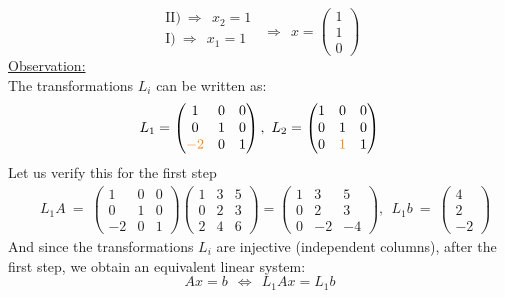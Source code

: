 \begin{frame}
{{$$\begin{matrix}
				\text{II)}~\Rightarrow~~x_2=1\\
				\text{I)}~\Rightarrow~~x_1=1\\
				\end{matrix}~~\Rightarrow~~x=\begin{pmatrix}1\\1\\0\end{pmatrix}
				$$
%			
					\underline{Observation:}\\
					The transformations $L_i$ can be written as:
					$$
					L_1=
					\begin{pmatrix}
					1&0&0\\0&1&0\\{\color{orange}-2}&0&1
					\end{pmatrix},~
					L_2=
					\begin{pmatrix}
					1&0&0\\0&1&0\\0&{\color{orange}1}&1
					\end{pmatrix}
					$$
				Let us verify this for the first step
				\begin{align*}
				&L_1A~=~\begin{pmatrix}
				1&0&0\\0&1&0\\-2&0&1
				\end{pmatrix}
				\begin{pmatrix}
				1&3&5\\0&2&3\\2&4&6
				\end{pmatrix}
				=\begin{pmatrix}
				1&3&5\\0&2&3\\0&-2&-4
				\end{pmatrix},~~L_1b~=~\begin{pmatrix}4\\2\\-2\end{pmatrix}
				\end{align*}
			And since the transformations $L_i$ are injective (independent columns), after the first step, we obtain an equivalent linear system: \vspace*{-0.08cm}
			$$Ax=b~~\Leftrightarrow~~L_1Ax=L_1b$$
			}
	}
\end{frame}


